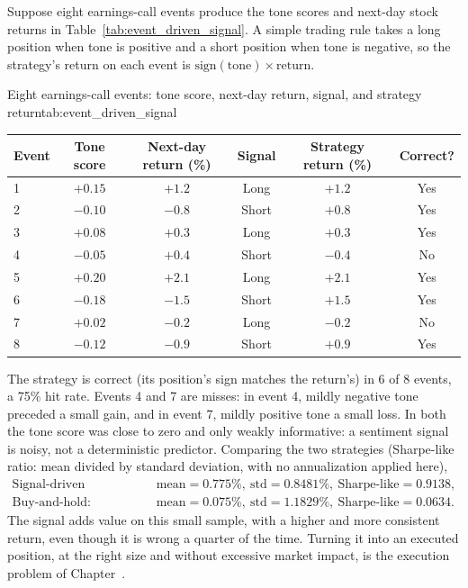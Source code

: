 \documentclass[../ai_in_finance]{subfiles}
\begin{document}
Suppose eight earnings-call events produce the tone scores and next-day stock returns in Table~\ref{tab:event_driven_signal}. A simple trading rule takes a long position when tone is positive and a short position when tone is negative, so the strategy's return on each event is $\text{sign}(\text{tone}) \times \text{return}$.

\begin{booktable}[htbp]{Eight earnings-call events: tone score, next-day return, signal, and strategy return}{tab:event_driven_signal}
\begin{tabular}{lccccc}
\toprule
Event & Tone score & Next-day return (\%) & Signal & Strategy return (\%) & Correct? \\
\midrule
1 & $+0.15$ & $+1.2$ & Long & $+1.2$ & Yes \\
2 & $-0.10$ & $-0.8$ & Short & $+0.8$ & Yes \\
3 & $+0.08$ & $+0.3$ & Long & $+0.3$ & Yes \\
4 & $-0.05$ & $+0.4$ & Short & $-0.4$ & No \\
5 & $+0.20$ & $+2.1$ & Long & $+2.1$ & Yes \\
6 & $-0.18$ & $-1.5$ & Short & $+1.5$ & Yes \\
7 & $+0.02$ & $-0.2$ & Long & $-0.2$ & No \\
8 & $-0.12$ & $-0.9$ & Short & $+0.9$ & Yes \\
\bottomrule
\end{tabular}
\end{booktable}

The strategy is correct (its position's sign matches the return's) in 6 of 8 events, a 75\% hit rate. Events 4 and 7 are misses: in event 4, mildly negative tone preceded a small gain, and in event 7, mildly positive tone a small loss. In both the tone score was close to zero and only weakly informative: a sentiment signal is noisy, not a deterministic predictor. Comparing the two strategies (Sharpe-like ratio: mean divided by standard deviation, with no annualization applied here),
\begin{align*}
\text{Signal-driven strategy:} &\quad \text{mean} = 0.775\%, \ \text{std} = 0.8481\%, \ \text{Sharpe-like} = 0.9138, \\
\text{Buy-and-hold:} &\quad \text{mean} = 0.075\%, \ \text{std} = 1.1829\%, \ \text{Sharpe-like} = 0.0634.
\end{align*} The signal adds value on this small sample, with a higher and more consistent return, even though it is wrong a quarter of the time. Turning it into an executed position, at the right size and without excessive market impact, is the execution problem of Chapter~.
\end{document}
